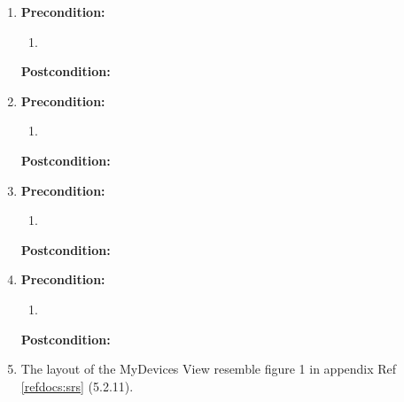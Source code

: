 \documentclass[a4paper]{article}
\newlength{\testlabellength}
\newenvironment{testlist}{\begin{enumerate}[label=\bfseries Instruction \thesubsection.\arabic* , labelindent=0pt, labelwidth=\testlabellength , leftmargin=2cm]}{\end{enumerate}}
\begin{document}
\begin{appendices}
\begin{testlist}
   \item \vspace{5mm} \textbf{Precondition:} 
    			\begin{enumerate}
                    \item 
                \end{enumerate}
                \textbf{Postcondition:} 
   
    \item \vspace{5mm} \textbf{Precondition:} 
    			\begin{enumerate}
                    \item 
                \end{enumerate}
                \textbf{Postcondition:} 
   
    \item \vspace{5mm} \textbf{Precondition:} 
    			\begin{enumerate}
                    \item 
                \end{enumerate}
                \textbf{Postcondition:} 
   
    \item \vspace{5mm} \textbf{Precondition:} 
    			\begin{enumerate}
                    \item 
                \end{enumerate}
                \textbf{Postcondition:} 
    
    \item The layout of the MyDevices View resemble figure 1 in appendix  Ref \ref{refdocs:srs} (5.2.11).
\end{testlist}


\end{appendices}
\end{document}
